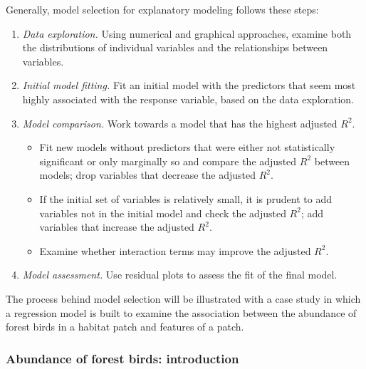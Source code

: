 Generally, model selection for explanatory modeling follows these steps:

\begin{enumerate}
	\item \textit{Data exploration.} Using numerical and graphical approaches, examine both the distributions of individual variables and the relationships between variables.
	
	\item \textit{Initial model fitting.} Fit an initial model with the predictors that seem most highly associated with the response variable, based on the data exploration.
	
	\item \textit{Model comparison.} Work towards a model that has the highest adjusted $R^2$.
	
	\begin{itemize}
		\item Fit new models without predictors that were either not statistically significant or only marginally so and compare the adjusted $R^2$ between models; drop variables that decrease the adjusted $R^2$. 
		
		\item If the initial set of variables is relatively small, it is prudent to add variables not in the initial model and check the adjusted $R^2$; add variables that increase the adjusted $R^2$.
		
		\item Examine whether interaction terms may improve the adjusted $R^2$.
	\end{itemize}
	
	\item \textit{Model assessment.} Use residual plots to assess the fit of the final model. 
	
\end{enumerate}

The process behind model selection will be illustrated with a case study in which a regression model is built to examine the association between the abundance of forest birds in a habitat patch and features of a patch. 



\textD{\newpage}


\subsubsection{Abundance of forest birds: introduction}

